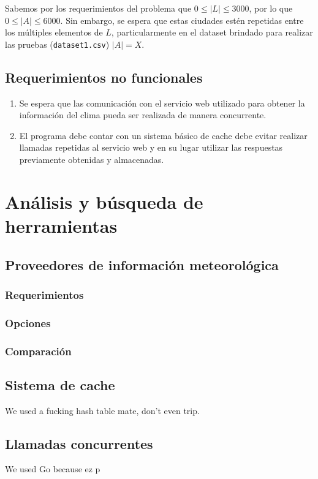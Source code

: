 \documentclass[10pt, letterpaper]{article}
\begin{document}
Sabemos por los requerimientos del problema que $0 \leq |L| \leq 3000$, por lo que
$0 \leq |A| \leq 6000$. Sin embargo, se espera que estas ciudades estén repetidas entre los múltiples
elementos de $L$, particularmente en el dataset brindado para realizar las pruebas
(\texttt{dataset1.csv}) $|A|=X$.

\subsection{Requerimientos no funcionales}

\begin{enumerate}
  \item Se espera que las comunicación con el servicio web utilizado para obtener la información del
  clima pueda ser realizada de manera concurrente.
  \item El programa debe contar con un sistema básico de cache debe evitar realizar llamadas
  repetidas al servicio web y en su lugar utilizar las respuestas previamente obtenidas y
  almacenadas. 
\end{enumerate}

\section{Análisis y búsqueda de herramientas}
\subsection{Proveedores de información meteorológica}
\subsubsection{Requerimientos}
\subsubsection{Opciones}
\subsubsection{Comparación}
\subsection{Sistema de cache}
We used a fucking hash table mate, don't even trip.
\subsection{Llamadas concurrentes}
We used Go because ez p
\end{document}
